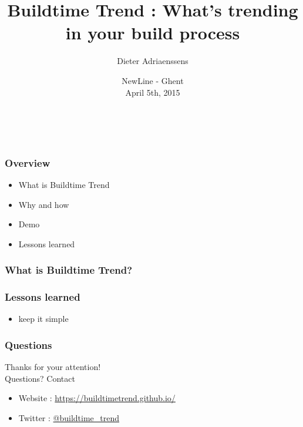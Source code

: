 \documentclass[14pt]{beamer}
\title[Buildtime Trend : What, why and how]{Buildtime Trend : What's trending in your build process}
\author{Dieter Adriaenssens}
\institute[Buildtime Trend]{@dcadriaenssens - Founder, developer Buildtime Trend}
\date[NewLine 5Apr2015]{NewLine - Ghent\\
April 5th, 2015}
\begin{document}
  \begin{frame}
    \titlepage
    \vfill
    \begin{center}
      \\[2.5ex]
        {\tiny\CcNote{\CcLongnameByNcSa}}
        \vspace*{-2.5ex}
    \end{center}
  \end{frame}
  \begin{frame}
    \frametitle{Overview}
    \begin{itemize}
      \item What is Buildtime Trend
      \item Why and how
      \item Demo
      \item Lessons learned
    \end{itemize}
  \end{frame}
  \begin{frame}
    \frametitle{What is Buildtime Trend?}
  \end{frame}
  \begin{frame}
    \frametitle{Lessons learned}
    \begin{itemize}
      \item keep it simple
    \end{itemize}
  \end{frame}
  \begin{frame}
   \frametitle{Questions}
    Thanks for your attention!\\
    Questions?
    \vfill
    Contact
    \begin{itemize}
      \item Website : \href{https://buildtimetrend.github.io/}{https://buildtimetrend.github.io/}
      \item Twitter : \href{https://twitter.com/buildtime_trend}{@buildtime\_trend}
    \end{itemize}
  \end{frame}
\end{document}
